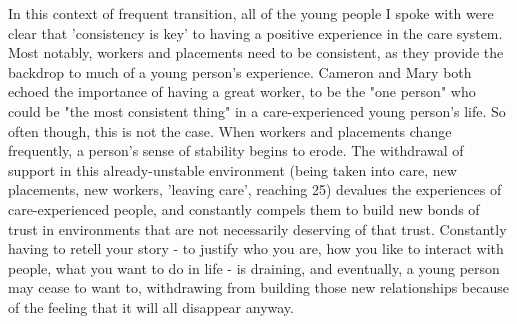 In this context of frequent transition, all of the young people I spoke with were clear that 'consistency is key' to having a positive experience in the care system. Most notably, workers and placements need to be consistent, as they provide the backdrop to much of a young person’s experience. Cameron and Mary both echoed the importance of having a great worker, to be the "one person" who could be "the most consistent thing" in a care-experienced young person's life. So often though, this is not the case. When workers and placements change frequently, a person’s sense of stability begins to erode. The withdrawal of support in this already-unstable environment (being taken into care, new placements, new workers, 'leaving care', reaching 25) devalues the experiences of care-experienced people, and constantly compels them to build new bonds of trust in environments that are not necessarily deserving of that trust. Constantly having to retell your story - to justify who you are, how you like to interact with people, what you want to do in life - is draining, and eventually, a young person may cease to want to, withdrawing from building those new relationships because of the feeling that it will all disappear anyway.

